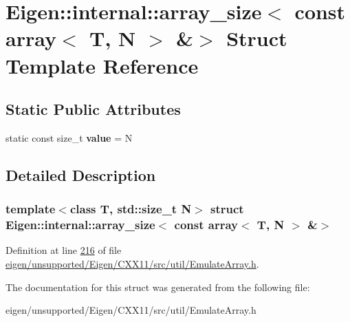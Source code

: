 \hypertarget{struct_eigen_1_1internal_1_1array__size_3_01const_01array_3_01_t_00_01_n_01_4_01_6_4}{}\section{Eigen\+:\+:internal\+:\+:array\+\_\+size$<$ const array$<$ T, N $>$ \&$>$ Struct Template Reference}
\label{struct_eigen_1_1internal_1_1array__size_3_01const_01array_3_01_t_00_01_n_01_4_01_6_4}
\subsection*{Static Public Attributes}
\begin{DoxyCompactItemize}
\item 
\mbox{\label{struct_eigen_1_1internal_1_1array__size_3_01const_01array_3_01_t_00_01_n_01_4_01_6_4_a12f186c630af76eade2e0535df616842}} 
static const size\+\_\+t {\bfseries value} = N
\end{DoxyCompactItemize}


\subsection{Detailed Description}
\subsubsection*{template$<$class T, std\+::size\+\_\+t N$>$\newline
struct Eigen\+::internal\+::array\+\_\+size$<$ const array$<$ T, N $>$ \&$>$}



Definition at line \hyperlink{eigen_2unsupported_2_eigen_2_c_x_x11_2src_2util_2_emulate_array_8h_source_l00216}{216} of file \hyperlink{eigen_2unsupported_2_eigen_2_c_x_x11_2src_2util_2_emulate_array_8h_source}{eigen/unsupported/\+Eigen/\+C\+X\+X11/src/util/\+Emulate\+Array.\+h}.



The documentation for this struct was generated from the following file\+:\begin{DoxyCompactItemize}
\item 
eigen/unsupported/\+Eigen/\+C\+X\+X11/src/util/\+Emulate\+Array.\+h\end{DoxyCompactItemize}

